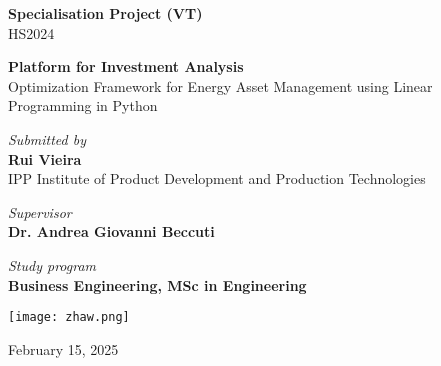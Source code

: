 \begin{titlepage}
\begin{center}

\textup{\small {\bf Specialisation Project (VT) } \\  HS2024}\\
\vspace{1.9in}

\fontsize{20}{24}\selectfont
\textbf {Platform for Investment Analysis}\\
\normalsize Optimization Framework for Energy Asset Management using Linear Programming in Python\\
\vspace{1.9in}

\textit{Submitted by} \\
\textbf{Rui Vieira}\\
IPP Institute of Product Development and Production Technologies\\
\vspace{.2in}

\textit{Supervisor} \\
\textbf{Dr. Andrea Giovanni Beccuti}\\
\vspace{1.9in}

\textit{{\normalsize Study program}} \\
\textbf{Business Engineering, MSc in Engineering}\\
\vspace{0.2in}

\texttt{[image: zhaw.png]}\\
\vspace{.2in}

February 15, 2025

\end{center}
\end{titlepage}